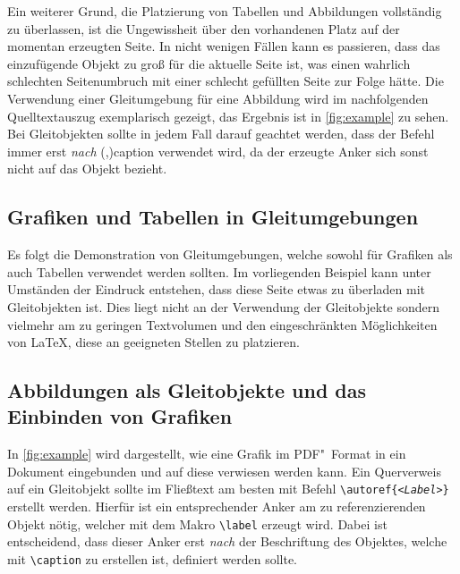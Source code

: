 \documentclass[%
  english,ngerman,%
  cdgeometry=no,DIV=12,%
  cd=false,cdfont=false,cdtitle=true,%
  headings=normal,%
  automark,%
  listof=toc,%
]{tudscrartcl}
\begin{document}
Ein weiterer Grund,  die Platzierung von Tabellen und 
Abbildungen vollständig zu überlassen, ist die Ungewissheit über den 
vorhandenen Platz auf der momentan erzeugten Seite. In nicht wenigen Fällen 
kann es passieren, dass das einzufügende Objekt zu groß für die aktuelle Seite 
ist, was einen wahrlich schlechten Seitenumbruch mit einer schlecht gefüllten 
Seite zur Folge hätte. Die Verwendung einer Gleitumgebung für eine Abbildung 
wird im nachfolgenden Quelltextauszug exemplarisch gezeigt, das Ergebnis ist in 
\autoref{fig:example} zu sehen. Bei Gleitobjekten sollte in jedem Fall darauf 
geachtet werden, dass der Befehl  immer erst \emph{nach} 
\Macro(,){caption} verwendet wird, da 
der erzeugte Anker sich sonst nicht auf das Objekt bezieht.
%
\begin{Trunk+}
\section{Grafiken und Tabellen in Gleitumgebungen}

Es folgt die Demonstration von Gleitumgebungen, welche sowohl für 
Grafiken als auch Tabellen verwendet werden sollten. Im vorliegenden 
Beispiel kann unter Umständen der Eindruck entstehen, dass diese Seite 
etwas zu überladen mit Gleitobjekten ist. Dies liegt nicht an der 
Verwendung der Gleitobjekte sondern vielmehr am zu geringen Textvolumen 
und den eingeschränkten Möglichkeiten von \LaTeX{}, diese an geeigneten 
Stellen zu platzieren. 



\subsection{Abbildungen als Gleitobjekte und das Einbinden von Grafiken}

In \autoref{fig:example} wird dargestellt, wie eine Grafik im PDF"~Format 
in ein Dokument eingebunden und auf diese verwiesen werden kann. Ein 
Querverweis auf ein Gleitobjekt sollte im Fließtext am besten mit Befehl 
\texttt{\textbackslash autoref\{\emph{<Label>}\}} erstellt werden. 
Hierfür ist ein entsprechender Anker am zu referenzierenden Objekt nötig, 
welcher mit dem Makro \texttt{\textbackslash label} erzeugt wird. Dabei 
ist entscheidend, dass dieser Anker erst \emph{nach} der Beschriftung des 
Objektes, welche mit \texttt{\textbackslash caption} zu erstellen ist, 
definiert werden sollte.

\end{Trunk+}
\end{document}
